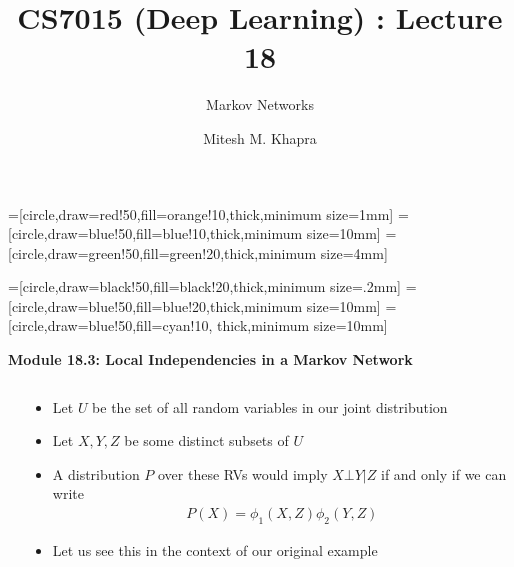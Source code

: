 \documentclass[serif,aspectratio=169,dvipsnames]{beamer}
\author{Mitesh M. Khapra}
\title{CS7015 (Deep Learning) : Lecture 18}
\subtitle{Markov Networks}
\institute{Department of Computer Science and Engineering\\ Indian Institute of Technology Madras}
\date{}
\newcommand\myheading[1]{%
\par\bigskip
{\Large\bfseries#1}\par\smallskip}
\begin{document}
=[circle,draw=red!50,fill=orange!10,thick,minimum size=1mm]
=[circle,draw=blue!50,fill=blue!10,thick,minimum size=10mm]
=[circle,draw=green!50,fill=green!20,thick,minimum size=4mm]

=[circle,draw=black!50,fill=black!20,thick,minimum size=.2mm]
=[circle,draw=blue!50,fill=blue!20,thick,minimum size=10mm]
=[circle,draw=blue!50,fill=cyan!10, thick,minimum size=10mm]
\begin{frame}
	\myheading{Module 18.3: Local Independencies in a Markov Network}
\end{frame}

\begin{frame}
	\begin{columns}
		\begin{overlayarea}{\textwidth}{\textheight}
		\end{overlayarea}
		\begin{overlayarea}{\textwidth}{\textheight}
			\begin{itemize}[<+->]\justifying
				\item Let $U$ be the set of all random variables in our joint distribution 
				\item Let $X,Y,Z$ be some distinct subsets of $U$
				\item A distribution $P$ over these RVs would imply $X\bot Y|Z$ if and only if we can write 
				\begin{align*}
				P(X) = \phi_1(X,Z)\phi_2(Y,Z)
				\end{align*}
				\item Let us see this in the context of our original example
			\end{itemize}
		\end{overlayarea}
	\end{columns}
\end{frame}
\end{document}
